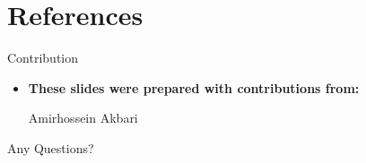 \documentclass[serif, aspectratio=169]{beamer}
\begin{document}
\section{References}

\begin{frame}{Contribution}
    \begin{itemize}
        \item \textbf{These slides were prepared with contributions from:}
        \begin{outline}
            \1 Amirhossein Akbari
        \end{outline}
    \end{itemize}
\end{frame}


\begin{frame}
    \begin{center}
        {\Huge Any Questions?}
    \end{center}
\end{frame}
\end{document}
